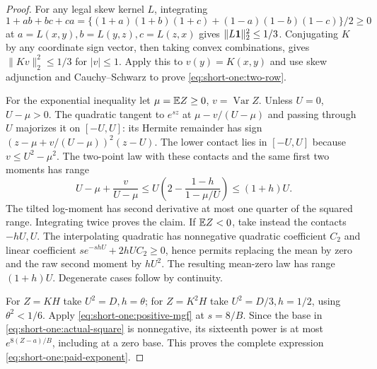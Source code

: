 \begin{proof}
For any legal skew kernel \(L\), integrating
\[
 1+ab+bc+ca
 =\{(1+a)(1+b)(1+c)+(1-a)(1-b)(1-c)\}/2\ge0
\]
at \(a=L(x,y),b=L(y,z),c=L(z,x)\) gives
\(\|L\mathbf1\|_2^2\le1/3\).
Conjugating \(K\) by any coordinate sign vector, then taking convex
combinations, gives \(\|Kv\|_2^2\le1/3\) for \(|v|\le1\).
Apply this to \(v(y)=K(x,y)\) and use skew adjunction and
Cauchy--Schwarz to prove \eqref{eq:short-one:two-row}.

For the exponential inequality let \(\mu=\mathbb E Z\ge0\), \(v=\operatorname{Var}Z\).
Unless \(U=0\), \(U-\mu>0\). The quadratic tangent to \(e^{sz}\)
at \(\mu-v/(U-\mu)\) and passing through \(U\) majorizes it on
\([-U,U]\): its Hermite remainder has sign
\((z-\mu+v/(U-\mu))^2(z-U)\).
The lower contact lies in \([-U,U]\) because \(v\le U^2-\mu^2\).
The two-point law with these contacts and the same first two moments
has range
\[
 U-\mu+\frac{v}{U-\mu}
 \le U\left(2-\frac{1-h}{1-\mu/U}\right)\le(1+h)U .
\]
The tilted log-moment has second derivative at most one quarter
of the squared range. Integrating twice proves the claim.
If \(\mathbb E Z<0\), take instead the contacts \(-hU,U\).
The interpolating quadratic has nonnegative quadratic coefficient
\(C_2\) and linear coefficient \(se^{-shU}+2hUC_2\ge0\), hence
permits replacing the mean by zero and the
raw second moment by \(hU^2\). The resulting mean-zero law has
range \((1+h)U\). Degenerate cases follow by continuity.

For \(Z=KH\) take \(U^2=D,h=\theta\); for \(Z=K^2H\) take
\(U^2=D/3,h=1/2\), using \(\theta^2<1/6\).
Apply \eqref{eq:short-one:positive-mgf} at \(s=8/B\).
Since the base in \eqref{eq:short-one:actual-square} is nonnegative,
its sixteenth power is at most \(e^{8(Z-a)/B}\), including at a
zero base. This proves the complete expression
\eqref{eq:short-one:paid-exponent}.
\end{proof}
